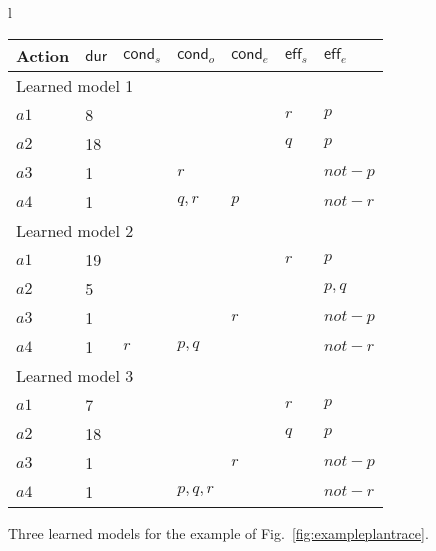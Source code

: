 \documentclass{ecai}
\newcommand{\eff}{\mathsf{eff}}    %
\newcommand{\cond}{\mathsf{cond}}  %
\newcommand{\dur}{\mathsf{dur}}    %
\begin{document}
\begin{figure}
\footnotesize
\begin{tabular}{l}
\hspace{-0.6cm}\begin{tabular}{lllllll}
Action & $\dur$ & $\cond_s$ & $\cond_o$ & $\cond_e$ & $\eff_s$ & $\eff_e$ \\

\hline

\multicolumn{7}{l}{Learned model 1} \\
$a1$ & 8 & & & & $r$ & $p$ \\
$a2$ & 18 & & & & $q$ & $p$ \\
$a3$ & 1 & & $r$ & & & $not-p$ \\
$a4$ & 1 & & $q,r$ & $p$ & & $not-r$ \\

\hline

\multicolumn{7}{l}{Learned model 2} \\
$a1$ & 19 & & & & $r$ & $p$ \\
$a2$ & 5 & & & & & $p,q$ \\
$a3$ & 1 & & & $r$ & & $not-p$ \\
$a4$ & 1 & $r$ & $p,q$ & & & $not-r$ \\

\hline

\multicolumn{7}{l}{Learned model 3} \\
$a1$ & 7 & & & & $r$ & $p$ \\
$a2$ & 18 & & & & $q$ & $p$ \\
$a3$ & 1 & & & $r$  & & $not-p$ \\
$a4$ & 1 & & $p,q,r$ & & & $not-r$ \\
\end{tabular} 



\end{tabular}
\normalsize

\caption{\small Three learned models for the example of Fig.~\ref{fig:exampleplantrace}.}
\label{figure:solutionsExample}
\end{figure}



\end{document}
